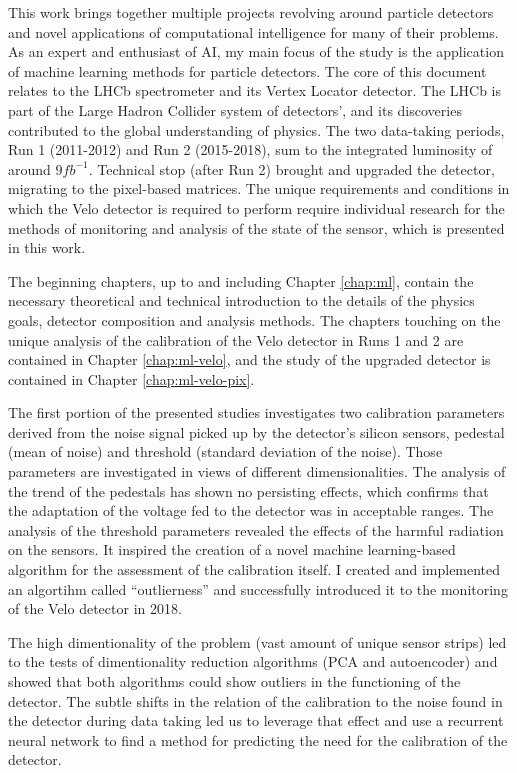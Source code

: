 This work brings together multiple projects revolving around particle detectors and novel applications of computational intelligence for many of their problems.
As an expert and enthusiast of AI, my main focus of the study is the application of machine learning methods for particle detectors.
The core of this document relates to the LHCb spectrometer and its Vertex Locator detector.
The LHCb is part of the Large Hadron Collider system of detectors', and its discoveries contributed to the global understanding of physics.
The two data-taking periods, Run 1 (2011-2012) and Run 2 (2015-2018), sum to the integrated luminosity of around $9fb^{-1}$.
Technical stop (after Run 2) brought and upgraded the detector, migrating to the pixel-based matrices.
The unique requirements and conditions in which the Velo detector is required to perform require individual research for the methods of monitoring and analysis of the state of the sensor, which is presented in this work.

The beginning chapters, up to and including Chapter \ref{chap:ml}, contain the necessary theoretical and technical introduction to the details of the physics goals, detector composition and analysis methods.
The chapters touching on the unique analysis of the calibration of the Velo detector in Runs 1 and 2 are contained in Chapter \ref{chap:ml-velo}, and the study of the upgraded detector is contained in Chapter \ref{chap:ml-velo-pix}.

The first portion of the presented studies investigates two calibration parameters derived from the noise signal picked up by the detector's silicon sensors, pedestal (mean of noise) and threshold (standard deviation of the noise). Those parameters are investigated in views of different dimensionalities.
The analysis of the trend of the pedestals has shown no persisting effects, which confirms that the adaptation of the voltage fed to the detector was in acceptable ranges.
The analysis of the threshold parameters revealed the effects of the harmful radiation on the sensors. It inspired the creation of a novel machine learning-based algorithm for the assessment of the calibration itself.
I created and implemented an algortihm called ``outlierness'' and successfully introduced it to the monitoring of the Velo detector in 2018.

The high dimentionality of the problem (vast amount of unique sensor strips) led to the tests of dimentionality reduction algorithms (PCA and autoencoder) and showed that both algorithms could show outliers in the functioning of the detector.
The subtle shifts in the relation of the calibration to the noise found in the detector during data taking led us to leverage that effect and use a recurrent neural network to find a method for predicting the need for the calibration of the detector.

